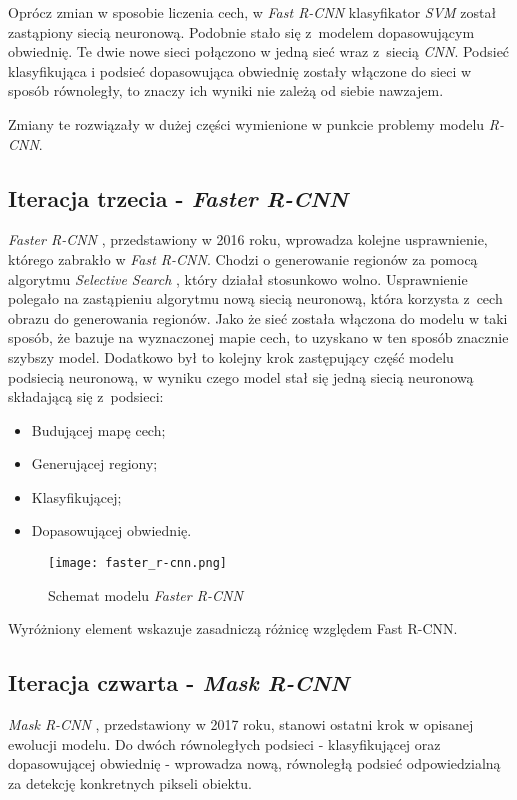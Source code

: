 Oprócz zmian w sposobie liczenia cech, w \textit{Fast R-CNN} klasyfikator \textit{SVM} został zastąpiony siecią neuronową.
Podobnie stało się z~modelem dopasowującym obwiednię.
Te dwie nowe sieci połączono w jedną sieć wraz z~siecią \textit{CNN}.
Podsieć klasyfikująca i podsieć dopasowująca obwiednię zostały włączone do sieci w sposób równoległy, to znaczy ich wyniki nie zależą od siebie nawzajem.

Zmiany te rozwiązały w dużej części wymienione w punkcie  problemy modelu \textit{R-CNN}.

\subsection{Iteracja trzecia - \textit{Faster R-CNN}}

\textit{Faster R-CNN} \cite{faster-rcnn}, przedstawiony w 2016 roku, wprowadza kolejne usprawnienie, którego zabrakło w \textit{Fast R-CNN}.
Chodzi o generowanie regionów za pomocą algorytmu \textit{Selective Search} \cite{selective-search}, który działał stosunkowo wolno.
Usprawnienie polegało na zastąpieniu algorytmu nową siecią neuronową, która korzysta z~cech obrazu do generowania regionów.
Jako że sieć została włączona do modelu w taki sposób, że bazuje na wyznaczonej mapie cech, to uzyskano w ten sposób znacznie szybszy model.
Dodatkowo był to kolejny krok zastępujący część modelu podsiecią neuronową, w wyniku czego model stał się jedną siecią neuronową składającą się z~podsieci:

\begin{itemize}
	\item Budującej mapę cech;
	\item Generującej regiony;
	\item Klasyfikującej;
	\item Dopasowującej obwiednię.
\end{itemize}

\begin{figure}[h]
  \centering
  \texttt{[image: faster\_r-cnn.png]}
  \caption{Schemat modelu \textit{Faster R-CNN}}
  \label{fig:faster_r_cnn}
\end{figure}

Wyróżniony element wskazuje zasadniczą różnicę względem Fast R-CNN.

\newpage
\subsection{Iteracja czwarta - \textit{Mask R-CNN}}
\label{sec:maskrcnn}
\textit{Mask R-CNN} \cite{matterport-mask-rcnn}, przedstawiony w 2017 roku, stanowi ostatni krok w opisanej ewolucji modelu.
Do dwóch równoległych podsieci - klasyfikującej oraz dopasowującej obwiednię - wprowadza nową, równoległą podsieć odpowiedzialną za detekcję konkretnych pikseli obiektu.

